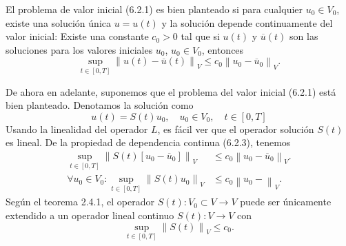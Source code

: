 \begin{frame}
	\frametitle{\insertsection}

	\begin{definition}
		El problema de valor inicial (6.2.1) es bien planteado si para cualquier
		$u_{0}\in V_{0}$, existe una solución única $u=u\left(t\right)$
		y la solución depende continuamente del valor inicial:
		Existe una constante $c_{0}>0$ tal que si $u\left(t\right)$
		y $\overline{u}\left(t\right)$ son las soluciones para los
		valores iniciales $u_{0}$, $u_{0}\in V_{0}$, entonces
		\begin{equation*}
			\sup_{t\in\left[0,T\right]}
			{\left\|
				u\left(t\right)-
				\overline{u}\left(t\right)
				\right\|}_{V}\leq
			c_{0}
				{\left\|
					u_{0}-
					\overline{u}_{0}
					\right\|}_{V}.
		\end{equation*}
	\end{definition}
	De ahora en adelante, suponemos que el problema del valor inicial (6.2.1) está bien planteado.
	Denotamos la solución como
	\begin{equation*}
		u\left(t\right)=
		S\left(t\right)
		u_{0},\quad u_{0}\in V_{0},\quad t\in\left[0,T\right]
	\end{equation*}
	Usando la linealidad del operador $L$, es fácil ver que
	el operador solución $S\left(t\right)$ es lineal.
	De la propiedad de dependencia continua (6.2.3), tenemos
	\begin{align*}
		\sup_{t\in\left[0,T\right]}
		{\left\|
			S\left(t\right)
			\left[u_{0}-\overline{u}_{0}\right]
		\right\|}_{V} & \leq
		c_{0}
			{\left\|
				u_{0}-
				\overline{u}_{0}
		\right\|}_{V}.       \\
		\forall u_{0}\in V_{0}:
		\sup_{t\in\left[0,T\right]}
		{\left\|
			S\left(t\right)
			u_{0}
		\right\|}_{V} & \leq
		c_{0}
			{\left\|
				u_{0}-
				\right\|}_{V}.
	\end{align*}
	Según el teorema 2.4.1, el operador
	$S\left(t\right)\colon V_{0}\subset V\to V$ puede ser únicamente
	extendido a un operador lineal continuo $S\left(t\right)\colon V\to V$
	con
	\begin{equation*}
		\sup_{t\in\left[0,T\right]}
		{\left\|
			S\left(t\right)
			\right\|}_{V} \leq
		c_{0}.
	\end{equation*}
\end{frame}

